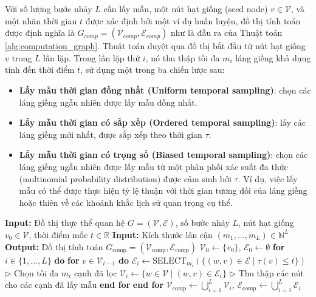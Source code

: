 Với số lượng bước nhảy $L$ cần lấy mẫu, một nút hạt giống (seed node) $v \in \mathcal{V}$, và một nhãn thời gian $t$ được xác định bởi một ví dụ huấn luyện, đồ thị tính toán được định nghĩa là $G_{comp}=(\mathcal{V}_{comp},\mathcal{E}_{comp})$ như là đầu ra của Thuật toán \ref{alg:computation_graph}. Thuật toán duyệt qua đồ thị bắt đầu từ nút hạt giống $v$ trong $L$ lần lặp. Trong lần lặp thứ $i$, nó thu thập tối đa $m_{i}$ láng giềng khả dụng tính đến thời điểm $t$, sử dụng một trong ba chiến lược sau:
\begin{itemize}
    \item \textbf{Lấy mẫu thời gian đồng nhất (Uniform temporal sampling)}: chọn các láng giềng ngẫu nhiên được lấy mẫu đồng nhất.
    \item \textbf{Lấy mẫu thời gian có sắp xếp (Ordered temporal sampling)}: lấy các láng giềng mới nhất, được sắp xếp theo thời gian $\tau$.
    \item \textbf{Lấy mẫu thời gian có trọng số (Biased temporal sampling)}: chọn các láng giềng ngẫu nhiên được lấy mẫu từ một phân phối xác suất đa thức (multinomial probability distribution) được cảm sinh bởi $\tau$. Ví dụ, việc lấy mẫu có thể được thực hiện tỷ lệ thuận với thời gian tương đối của láng giềng hoặc thiên về các khoảnh khắc lịch sử quan trọng cụ thể.
\end{itemize}
\begin{algorithm}
\caption{Đồ thị Tính toán Nhất quán theo Thời gian}
\label{alg:computation_graph}
\begin{algorithmic}[1]
\State \textbf{Input:} Đồ thị thực thể quan hệ $G=(\mathcal{V},\mathcal{E})$, số bước nhảy $L$, nút hạt giống $v_{0}\in\mathcal{V}$, thời điểm mốc $t\in\mathbb{R}$
\State \textbf{Input:} Kích thước lân cận $(m_{1},...,m_{L})\in\mathbb{N}^{L}$
\State \textbf{Output:} Đồ thị tính toán $G_{\text{comp}}=(\mathcal{V}_{\text{comp}},\mathcal{E}_{\text{comp}})$
\State $\mathcal{V}_{0}\leftarrow\{v_{0}\}$, $\mathcal{E}_{0}\leftarrow\emptyset$
\State \textbf{for} $i \in \{1,...,L\}$ \textbf{do}
\State \quad \textbf{for} $v \in \mathcal{V}_{i-1}$ \textbf{do}
\State \quad \quad $\mathcal{E}_{i} \leftarrow \text{SELECT}_{m_{i}}(\{(w,v)\in\mathcal{E} \mid \tau(v)\le t\})$ \quad $\triangleright$ Chọn tối đa $m_i$ cạnh đã lọc
\State \quad \quad $\mathcal{V}_{i} \leftarrow \{w\in\mathcal{V} \mid (w,v)\in\mathcal{E}_{i}\}$ \quad $\triangleright$ Thu thập các nút cho các cạnh đã lấy mẫu
\State \quad \textbf{end for}
\State \textbf{end for}
\State$\mathcal{V}_{\text{comp}} \leftarrow \bigcup_{i=1}^{L}\mathcal{V}_{i}$, \quad $\mathcal{E}_{\text{comp}} \leftarrow \bigcup_{i=1}^{L}\mathcal{E}_{i}$
\end{algorithmic}
\end{algorithm}

